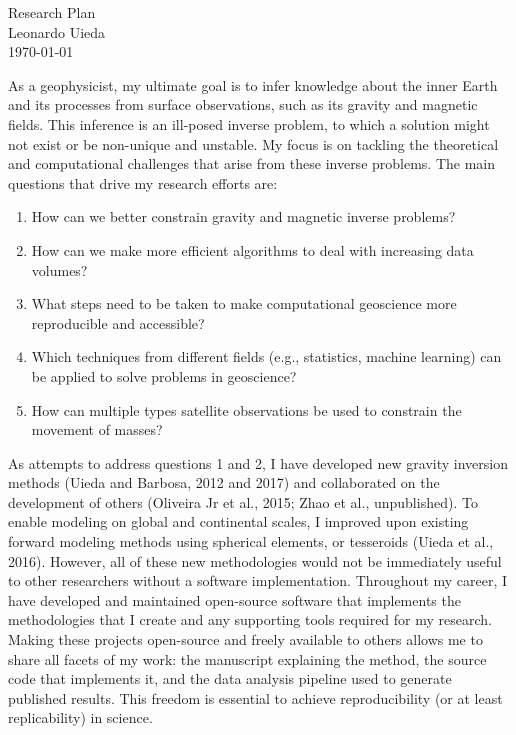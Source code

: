 \documentclass[12pt,notitlepage]{article}
\begin{document}
\begin{center}
    {\huge Research Plan}
    \\[0.2in]
    {Leonardo Uieda}
    \\[0.1in]
    {\small \today}
\end{center}


As a geophysicist, my ultimate goal is to infer knowledge about the inner Earth and its
processes from surface observations, such as its gravity and magnetic fields.
This inference is an ill-posed inverse problem, to which a solution might not exist or
be non-unique and unstable.
My focus is on tackling the theoretical and computational challenges that arise from
these inverse problems.
The main questions that drive my research efforts are:

\begin{enumerate}
    \item How can we better constrain gravity and magnetic inverse problems?
    \item How can we make more efficient algorithms to deal with increasing data volumes?
    \item What steps need to be taken to make computational geoscience more reproducible
        and accessible?
    \item Which techniques from different fields (e.g., statistics, machine learning)
        can be applied to solve problems in geoscience?
    \item How can multiple types satellite observations be used to constrain the
        movement of masses?
\end{enumerate}

As attempts to address questions 1 and 2, I have developed new gravity inversion methods
(Uieda and Barbosa, 2012 and 2017) and collaborated on the development of others
(Oliveira Jr et al., 2015; Zhao et al., unpublished).
To enable modeling on global and continental scales, I improved upon existing forward
modeling methods using spherical elements, or tesseroids (Uieda et al., 2016).
However, all of these new methodologies would not be immediately useful to other
researchers without a software implementation.
Throughout my career, I have developed and maintained open-source software that
implements the methodologies that I create and any supporting tools required for my
research.
Making these projects open-source and freely available to others allows me to share all
facets of my work: the manuscript explaining the method, the source code that implements
it, and the data analysis pipeline used to generate published results.
This freedom is essential to achieve reproducibility (or at least replicability) in
science.
\end{document}
